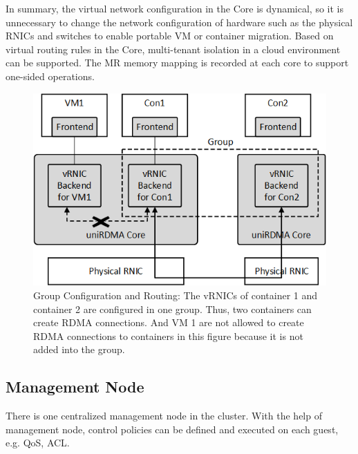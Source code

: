 
In summary, the virtual network configuration in the \sys Core is dynamical, so it is unnecessary to change the network configuration of hardware such as the physical RNICs and switches to enable portable VM or container migration. Based on virtual routing rules in the \sys Core, multi-tenant isolation in a cloud environment can be supported. The MR memory mapping is recorded at each \sys core to support one-sided operations.

\begin{figure}[!ht]
	\centering
	\includegraphics[width=1.0\linewidth]{images/route-config}
	\caption{Group Configuration and Routing: The vRNICs of container 1 and container 2 are configured in one group. Thus, two containers can create RDMA connections. And VM 1 are not allowed to create RDMA connections to containers in this figure because it is not added into the group. }
	\label{fig:route-config}
\end{figure}

\subsection{Management Node}

There is one centralized management node in the cluster. With the help of management node, control policies can be defined and executed on each guest, e.g. QoS, ACL.


